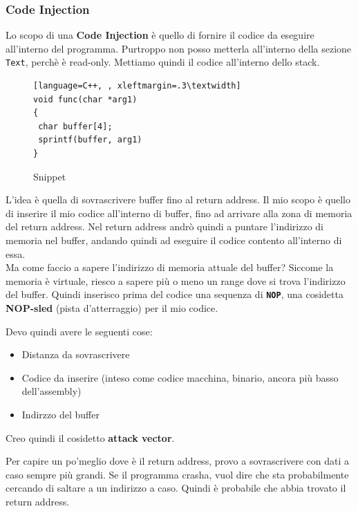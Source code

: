 \documentclass[a4paper,12pt]{article}
\begin{document}
\subsubsection{Code Injection}
Lo scopo di una \textbf{Code Injection} è quello di fornire il codice da eseguire all'interno del programma. Purtroppo non posso metterla all'interno della sezione \texttt{Text}, perchè è read-only. Mettiamo quindi il codice all'interno dello stack.

\begin{figure}[H]
\begin{lstlisting}[language=C++, , xleftmargin=.3\textwidth]
void func(char *arg1)
{
 char buffer[4];
 sprintf(buffer, arg1)
}
\end{lstlisting}
\caption{Snippet}
\end{figure}
L'idea è quella di sovrascrivere buffer fino al return address. Il mio scopo è quello di inserire il mio codice all'interno di buffer, fino ad arrivare alla zona di memoria del return address. Nel return address andrò quindi a puntare l'indirizzo di memoria nel buffer, andando quindi ad eseguire il codice contento all'interno di essa.\\
Ma come faccio a sapere l'indirizzo di memoria attuale del buffer? Siccome la memoria è virtuale, riesco a sapere più o meno un range dove si trova l'indirizzo del buffer. Quindi inserisco prima del codice una sequenza di \textbf{\texttt{NOP}}, una cosidetta \textbf{NOP-sled} (pista d'atterraggio) per il mio codice.

Devo quindi avere le seguenti cose:
\begin{itemize}
\item Distanza da sovrascrivere
\item Codice da inserire (inteso come codice macchina, binario, ancora più basso dell'assembly)
\item Indirzzo del buffer
\end{itemize}

Creo quindi il cosidetto \textbf{attack vector}.


Per capire un po'meglio dove è il return address, provo a sovrascrivere con dati a caso sempre più grandi. Se il programma crasha, vuol dire che sta probabilmente cercando di saltare a un indirizzo a caso. Quindi è probabile che abbia trovato il return address.
\end{document}
